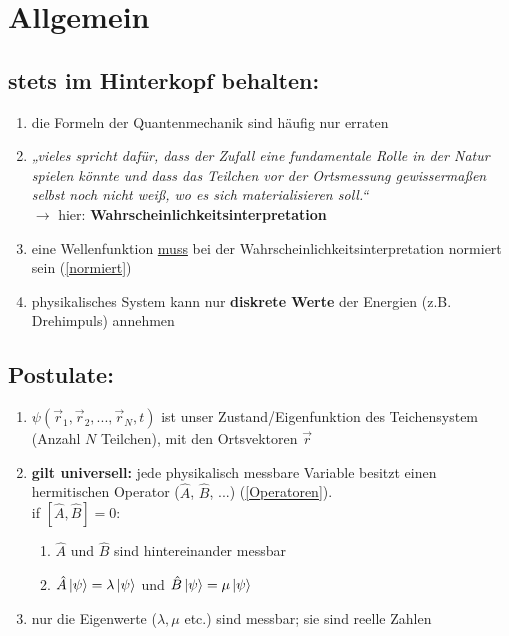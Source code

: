 \pagestyle{headings}

\section{Allgemein}

\subsection{stets im Hinterkopf behalten:}
\begin{enumerate}
\item die Formeln der Quantenmechanik sind häufig nur erraten
\item \textit{„vieles spricht dafür, dass der Zufall eine fundamentale Rolle in der Natur spielen könnte und dass 
das Teilchen vor der Ortsmessung gewissermaßen selbst noch nicht weiß, wo es sich materialisieren soll.“} \\
$\rightarrow$ hier: \textbf{Wahrscheinlichkeitsinterpretation}
\item eine Wellenfunktion \underline{muss} bei der Wahrscheinlichkeitsinterpretation normiert sein (\ref{normiert})
\item physikalisches System kann nur \textbf{diskrete Werte} der Energien (z.B. Drehimpuls) annehmen
\end{enumerate}

\subsection{Postulate:}
\begin{enumerate}
\item $\psi(\vec{r}_1,\vec{r}_2, ...,\vec{r}_N,t)$ ist unser Zustand/Eigenfunktion des Teichensystem (Anzahl $N$ Teilchen), mit den Ortsvektoren $\vec{r}$
\item \textbf{gilt universell:} jede physikalisch messbare Variable besitzt einen hermitischen Operator ($\hat{A}$, $\hat{B}$, ...) (\ref{Operatoren}).\\
 if $[\hat{A},\hat{B}]=0$:
\begin{enumerate}
    \item $\hat{A}$ und $\hat{B}$ sind hintereinander messbar
    \item $\hat{A}\ket{\psi}=\lambda\ket{\psi}$ und $\hat{B}\ket{\psi}=\mu\ket{\psi}$
\end{enumerate}
\item nur die Eigenwerte ($\lambda,\mu$ etc.) sind messbar; sie sind reelle Zahlen 

\end{enumerate}



